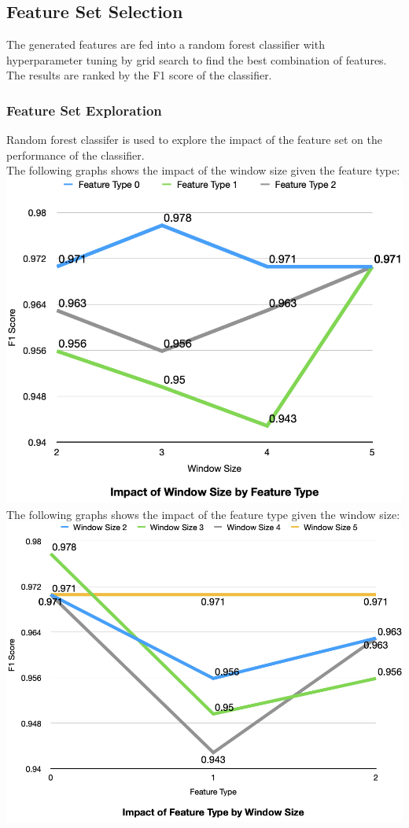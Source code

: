 \documentclass{article}
\begin{document}
    \subsection{Feature Set Selection}
    The generated features are fed into a random forest classifier with hyperparameter tuning by grid search to find the best combination of features.
    The results are ranked by the F1 score of the classifier. 
    \subsubsection{Feature Set Exploration}
    Random forest classifer is used to explore the impact of the feature set on the performance of the classifier.\\
    The following graphs shows the impact of the window size given the feature type:\\
    \includegraphics[width=13.4cm]{./by_feature.png}\\
    The following graphs shows the impact of the feature type given the window size:\\
    \includegraphics[width=13.4cm]{./by_window_size.png}\\
\end{document}
